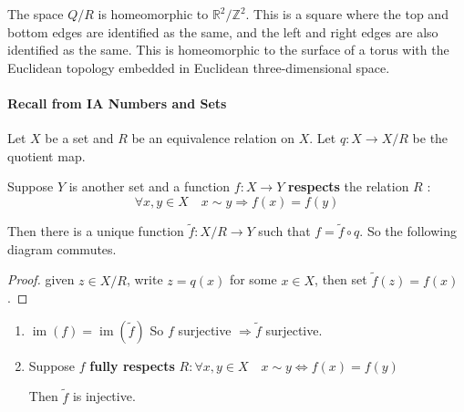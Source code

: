 \documentclass[a4paper,11pt]{article}
\begin{document}
\begin{example}
\begin{enumerate}
\begin{center}
\end{center}
The space \( Q / R \) is homeomorphic to \( \mathbb R^2 / \mathbb Z^2 \).
	This is a square where the top and bottom edges are identified as the same, and the left and right edges are also identified as the same.
	This is homeomorphic to the surface of a torus with the Euclidean topology embedded in Euclidean three-dimensional space.
\end{enumerate}
\end{example}

\paragraph{Recall from IA Numbers and Sets }
Let $X$ be a set and $R$ be an equivalence relation on $X$. Let $q: X \rightarrow X / R$ be the quotient map.

Suppose $Y$ is another set and a function $f: X \rightarrow Y$ \textbf{respects} the relation $R$ :
$$
\forall x, y \in X \quad x \sim y \Longrightarrow f(x)=f(y)
$$

Then there is a unique function $\tilde{f}: X / R \rightarrow Y$ such that $f=\tilde{f} \circ q$. So the following diagram commutes. 
\begin{center}
\end{center}
\begin{proof}
    given $z \in X / R$, write $z=q(x)$ for some $x \in X$, then set $\tilde{f}(z)=f(x)$.
\end{proof}

\begin{note}
    \begin{enumerate}
        \item $\operatorname{im}(f)=\operatorname{im}(\tilde{f})$ So $f$ surjective $\Longrightarrow \tilde{f}$ surjective.
      
        \item Suppose $f$ \textbf{fully respects} $R: \forall x, y \in X \quad x \sim y \Longleftrightarrow f(x)=f(y)$
        
        Then $\tilde{f}$ is injective.
      \end{enumerate}
\end{note}
\end{document}
